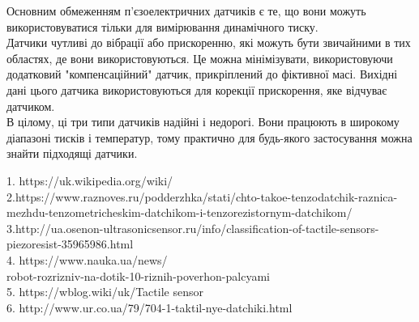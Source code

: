 \documentclass[a4paper,fontsize=12]{report}
\begin{document}
  Основним обмеженням п'єзоелектричних датчиків є те, що вони можуть використовуватися тільки для вимірювання динамічного тиску.\\

  Датчики чутливі до вібрації або прискоренню, які можуть бути звичайними в тих областях, де вони використовуються. Це можна мінімізувати, використовуючи додатковий "компенсаційний" датчик, прикріплений до фіктивної масі. Вихідні дані цього датчика використовуються для корекції прискорення, яке відчуває датчиком.\\

  В цілому, ці три типи датчиків надійні і недорогі. Вони працюють в широкому діапазоні тисків і температур, тому практично для будь-якого застосування можна знайти підходящі датчики. 




\begin{thebibliography}{9}
1. https://uk.wikipedia.org/wiki/\\
2.https://www.raznoves.ru/podderzhka/stati/chto-takoe-tenzodatchik-raznica-mezhdu-tenzometricheskim-datchikom-i-tenzorezistornym-datchikom/\\
3.http://ua.osenon-ultrasonicsensor.ru/info/classification-of-tactile-sensors-piezoresist-35965986.html\\
4. https://www.nauka.ua/news/\\robot-rozrizniv-na-dotik-10-riznih-poverhon-palcyami\\
5. https://wblog.wiki/uk/Tactile sensor\\
6. http://www.ur.co.ua/79/704-1-taktil-nye-datchiki.html \\







\end{thebibliography}
 
\end{document}

